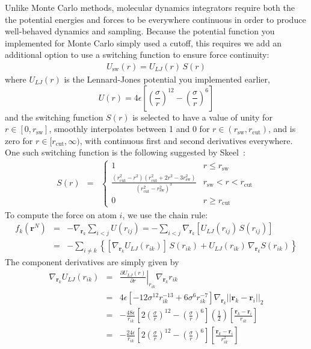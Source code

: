 \documentclass[aip,jcp,preprint,superscriptaddress,floatfix]{revtex4-1}
\begin{document}
Unlike Monte Carlo methods, molecular dynamics integrators require both the the potential energies and forces to be everywhere continuous in order to produce well-behaved dynamics and sampling.
Because the potential function you implemented for Monte Carlo simply used a cutoff, this requires we add an additional option to use a switching function to ensure force continuity:
\begin{eqnarray}
U_\mathrm{sw}(r) = U_{LJ}(r) \, S(r)
\end{eqnarray}
where $U_{LJ}(r)$ is the Lennard-Jones potential you implemented earlier, 
\begin{equation}
U(r) = 4 \epsilon \left[\left(\frac{\sigma}{r}\right)^{12} -\left(\frac{\sigma}{r}\right)^{6} \right] 
\end{equation}
and the switching function $S(r)$ is selected to have a value of unity for $r \in [0, r_\mathrm{sw}]$, smoothly interpolates between 1 and 0 for $r \in (r_\mathrm{sw}, r_\mathrm{cut})$, and is zero for $r \in [r_\mathrm{cut}, \infty)$, with continuous first and second derivatives everywhere.
One such switching function is the following suggested by Skeel~\cite{Skeel.SIAMJSciComput.31.1363.2009}:
\begin{eqnarray}
S(r) &=& \begin{cases}
1 & r \le r_\mathrm{sw} \\
\frac{(r_\mathrm{cut}^2 - r^2) (r_\mathrm{cut}^2 + 2 r^2 - 3 r_\mathrm{sw}^2)}{(r_\mathrm{cut}^2 - r_\mathrm{sw}^2)^3} & r_\mathrm{sw} < r < r_\mathrm{cut} \\
0 & r \ge r_\mathrm{cut}
\end{cases}
\end{eqnarray}
To compute the force on atom $i$, we use the chain rule:
\begin{eqnarray}
f_k(\textbf{r}^N) &=& - \nabla_{\textbf{r}_k} \sum_{i < j} U(r_{ij}) =  - \sum_{i < j} \nabla_{\textbf{r}_k} \left[ U_{LJ}(r_{ij}) \, S(r_{ij}) \right] \nonumber \\
&=& - \sum_{i \ne k} \left\{ [ \nabla_{\textbf{r}_k} U_{LJ}(r_{ik}) ] \, S(r_{ik}) + U_{LJ}(r_{ik}) \,  \nabla_{\textbf{r}_k} S(r_{ik}) \right\}
\end{eqnarray}
The component derivatives are simply given by
\begin{eqnarray}
\nabla_{\mathbf{r}_k} U_{LJ}(r_{ik}) &=& \left. \frac{\partial U_{LJ}(r)}{\partial r} \right|_{r_{ik}} \nabla_{\mathbf{r}_k} r_{ik}  \\
&=& 4 \epsilon \left[- 12 \sigma^{12} r_{ik}^{-13} + 6 \sigma^6 r_{ik}^{-7} \right] \nabla_{\mathbf{r}_k} || \mathbf{r}_k - \mathbf{r}_i ||_2  \\
&=& - \frac{48 \epsilon}{r_{ik}} \left[2 \left(\frac{\sigma}{r}\right)^{12} - \left(\frac{\sigma}{r}\right)^{6} \right] \left( \frac{1}{2}\right) \left[ \frac{\mathbf{r}_k - \mathbf{r}_i}{r_{ik}} \right] \\
&=& - \frac{24 \epsilon}{r_{ik}} \left[2 \left(\frac{\sigma}{r}\right)^{12} - \left(\frac{\sigma}{r}\right)^{6} \right]  \left[ \frac{\mathbf{r}_k - \mathbf{r}_i}{r_{ik}^2} \right]  \\
\end{eqnarray}
\end{document}
